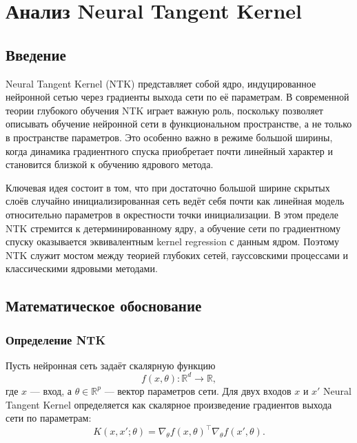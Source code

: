 \section{Анализ Neural Tangent Kernel}

\subsection{Введение}

Neural Tangent Kernel (NTK) представляет собой ядро, индуцированное нейронной сетью через градиенты выхода сети по её параметрам. В современной теории глубокого обучения NTK играет важную роль, поскольку позволяет описывать обучение нейронной сети в функциональном пространстве, а не только в пространстве параметров. Это особенно важно в режиме большой ширины, когда динамика градиентного спуска приобретает почти линейный характер и становится близкой к обучению ядрового метода.

Ключевая идея состоит в том, что при достаточно большой ширине скрытых слоёв случайно инициализированная сеть ведёт себя почти как линейная модель относительно параметров в окрестности точки инициализации. В этом пределе NTK стремится к детерминированному ядру, а обучение сети по градиентному спуску оказывается эквивалентным kernel regression с данным ядром. Поэтому NTK служит мостом между теорией глубоких сетей, гауссовскими процессами и классическими ядровыми методами.

\subsection{Математическое обоснование}

\subsubsection{Определение NTK}

Пусть нейронная сеть задаёт скалярную функцию
\begin{equation}
    f(x,\theta): \mathbb{R}^d \to \mathbb{R},
\end{equation}
где $x$ --- вход, а $\theta \in \mathbb{R}^p$ --- вектор параметров сети. Для двух входов $x$ и $x'$ Neural Tangent Kernel определяется как скалярное произведение градиентов выхода сети по параметрам:
\begin{equation}
    K(x,x';\theta)=\nabla_{\theta} f(x,\theta)^{\top}\nabla_{\theta} f(x',\theta).
    \label{eq:ntk_def}
\end{equation}


